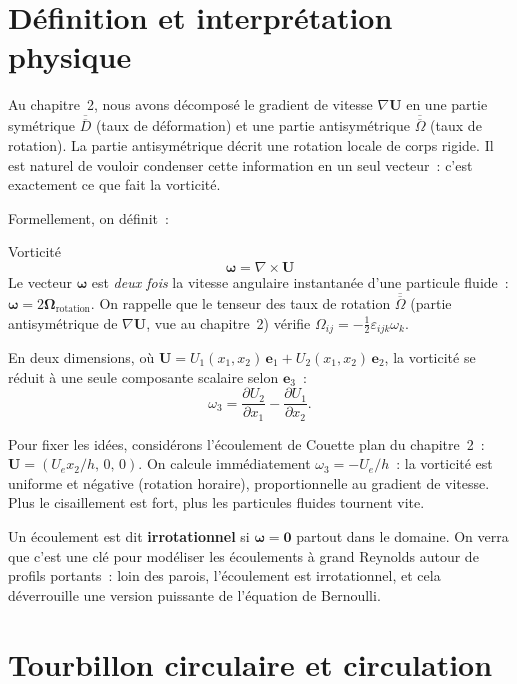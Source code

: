 \documentclass[11pt,a4paper]{report}
\newcommand{\pd}[2]{\dfrac{\partial #1}{\partial #2}}
\newcommand{\ten}[1]{\overline{\overline{#1}}}   %
\begin{document}
\section{D\'efinition et interpr\'etation physique}

Au chapitre~2, nous avons d\'ecompos\'e le gradient de vitesse $\nabla\bm{U}$ en une partie
sym\'etrique $\ten{D}$ (taux de d\'eformation) et une partie antisym\'etrique $\ten{\Omega}$
(taux de rotation). La partie antisym\'etrique d\'ecrit une rotation locale de corps rigide.
Il est naturel de vouloir condenser cette information en un seul vecteur~: c'est exactement
ce que fait la vorticit\'e.

Formellement, on d\'efinit~:

\begin{defbox}{Vorticit\'e}
\[
  \boldsymbol{\omega} = \nabla \times \bm{U}
\]
Le vecteur $\boldsymbol{\omega}$ est \emph{deux fois} la vitesse angulaire instantan\'ee
d'une particule fluide~: $\boldsymbol{\omega} = 2\boldsymbol{\Omega}_\text{rotation}$.
On rappelle que le tenseur des taux de rotation $\ten{\Omega}$
(partie antisym\'etrique de $\nabla\bm{U}$, vue au chapitre~2) v\'erifie
$\Omega_{ij} = -\tfrac{1}{2}\varepsilon_{ijk}\omega_k$.
\end{defbox}

En deux dimensions, o\`u $\bm{U} = U_1(x_1,x_2)\,\bm{e}_1 + U_2(x_1,x_2)\,\bm{e}_2$,
la vorticit\'e se r\'eduit \`a une seule composante scalaire selon $\bm{e}_3$~:
\[
  \omega_3 = \pd{U_2}{x_1} - \pd{U_1}{x_2}.
\]

Pour fixer les id\'ees, consid\'erons l'\'ecoulement de Couette plan du chapitre~2~:
$\bm{U} = (U_e x_2/h,\,0,\,0)$. On calcule imm\'ediatement $\omega_3 = -U_e/h$~: la
vorticit\'e est uniforme et n\'egative (rotation horaire), proportionnelle au gradient
de vitesse. Plus le cisaillement est fort, plus les particules fluides tournent vite.

Un \'ecoulement est dit \textbf{irrotationnel} si $\boldsymbol{\omega} = \bm{0}$
partout dans le domaine. On verra que c'est une cl\'e pour mod\'eliser les \'ecoulements
\`a grand Reynolds autour de profils portants~: loin des parois, l'\'ecoulement est
irrotationnel, et cela d\'everrouille une version puissante de l'\'equation de Bernoulli.

\section{Tourbillon circulaire et circulation}
\end{document}
